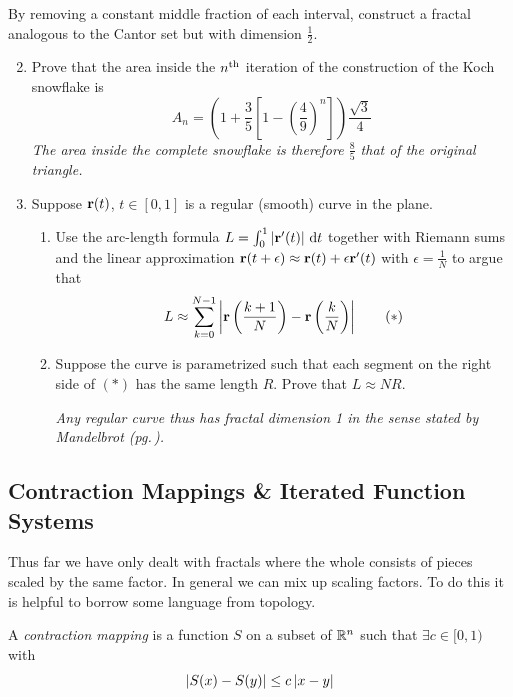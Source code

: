 \begin{exercises}
\exstart By removing a constant middle fraction of each interval, construct a fractal analogous to the Cantor set but with dimension $\frac 12$.

\begin{enumerate}\setcounter{enumi}{1}\itemsep2pt
	\item Prove that the area inside the $n\textsuperscript{th}$ iteration of the construction of the Koch snowflake is
	\[A_n=\left(1+\frac 35\left[1-\left(\frac 49\right)^n\right]\right)\frac{\sqrt 3}{4}\]
	\emph{The area inside the complete snowflake is therefore $\frac 85$ that of the original triangle.}
	
	\item Suppose ${\mathbf{r}}(t)$, $t\in [0,1]$ is a regular (smooth) curve in the plane.
	\begin{enumerate}
  	\item Use the arc-length formula $L=\int_0^1\left| {\mathbf{r}}'(t)\right|\,{\mathrm{d} t}$ together with Riemann sums and the linear approximation ${\mathbf{r}}(t+\epsilon)\approx{\mathbf{r}}(t)+\epsilon{\mathbf{r}}'(t)$ with $\epsilon=\frac 1N$ to argue that
  	\[L\approx\sum_{k=0}^{N-1}\left| {\mathbf{r}}\left(\frac{k+1}N\right)-{\mathbf{r}}\left(\frac{k}N\right)\right| \tag{$\ast$}\]

  	\item Suppose the curve is parametrized such that each segment on the right side of $(\ast)$ has the same length $R$. Prove that $L\approx NR$.\par
  	\emph{Any regular curve thus has fractal dimension 1 in the sense stated by Mandelbrot (pg.\,\pageref{sec:fracdefn}).}  
	\end{enumerate}
	
\end{enumerate}
\end{exercises}


\clearpage




\subsection{Contraction Mappings \& Iterated Function Systems}

Thus far we have only dealt with fractals where the whole consists of pieces scaled by the same factor. In general we can mix up scaling factors. To do this it is helpful to borrow some language from topology.

\begin{defn}{}{}
A \emph{contraction mapping} is a function $S$ on a subset of $\mathbb{R}^n$ such that $\exists c\in[0,1)$ with
\[\left| S(x)-S(y)\right|\le c\left| x-y\right|\]
\end{defn}

